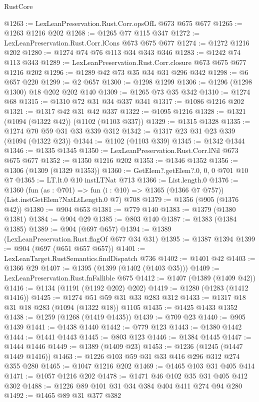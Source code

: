 \begin{lexlean}{RustCore}
\begin{coremodule}
@1263 := LexLeanPreservation.Rust.Corr.opsOfL @673 @675 @677
@1265 := @1263 @1216 @202
@1268 := @1265 @77 @115 @347
@1272 := LexLeanPreservation.Rust.Corr.lCons @673 @675 @677
@1274 := @1272 @1216 @202
@1280 := @1274 @74 @76 @113 @34 @343 @346
@1283 := @1242 @74 @113 @343
@1289 := LexLeanPreservation.Rust.Corr.closure @673 @675 @677 @1216 @202
@1296 := @1289 @42 @73 @35 @34 @31 @296 @342
@1298 := @6 @657 @220
@1299 := @2 @657
@1300 := @1298 @1299
@1306 := @1296 (@1298 @1300) @18 @202 @202 @140
@1309 := @1265 @73 @35 @342
@1310 := @1274 @68
@1315 := @1310 @72 @31 @34 @337 @341
@1317 := @1086 @1216 @202
@1321 := @1317 @42 @31 @42 @337
@1322 := @1095 @1216
@1328 := @1321 (@1094 (@1322 @42)) (@1102 (@1103 @337))
@1329 := @1315 @1328
@1335 := @1274 @70 @59 @31 @33 @339 @312
@1342 := @1317 @23 @31 @23 @339 (@1094 (@1322 @23))
@1344 := @1102 (@1103 @339)
@1345 := @1342 @1344
@1346 := @1335 @1345
@1350 := LexLeanPreservation.Rust.Corr.lNil @673 @675 @677
@1352 := @1350 @1216 @202
@1353 := @1346 @1352
@1356 := @1306 (@1309 (@1329 @1353))
@1360 := GetElem?.getElem?.{0, 0, 0} @701 @10 @7
@1365 := LT.lt.{0} @10 instLTNat @713
@1366 := List.length.{0}
@1376 := @1360
    (fun (as : @701) => fun (i : @10) => @1365 (@1366 @7 @757))
    (List.instGetElem?NatLtLength.{0} @7)
    @708
@1379 := @1356 (@905 (@1376 @42))
@1380 := @904 @653
@1381 := @779 @140
@1383 := @1379 (@1380 @1381)
@1384 := @904 @29
@1385 := @803 @140
@1387 := @1383 (@1384 @1385)
@1389 := @904 (@697 @657)
@1394 := @1389 (LexLeanPreservation.Rust.flagOf @677 @34 @31)
@1395 := @1387 @1394
@1399 := @904 (@697 (@651 @657 @657))
@1401 := LexLeanTarget.RustSemantics.findDispatch @736
@1402 := @1401 @42
@1403 := @1366 @29
@1407 := @1395 (@1399 (@1402 (@1403 @35)))
@1409 := LexLeanPreservation.Rust.fnFallible @675
@1412 := @1407 (@1389 (@1409 @42))
@1416 := @1134 (@1191 (@1192 @202) @202)
@1419 := @1280 (@1283 (@1412 @1416))
@1425 := @1274 @51 @59 @31 @33 @283 @312
@1433 := @1317 @18 @31 @18 @283 (@1094 (@1322 @18)) @1105
@1435 := @1425 @1433 @1352
@1438 := @1259 (@1268 (@1419 @1435))
@1439 := @709 @23
@1440 := @905 @1439
@1441 := @1438 @1440
@1442 := @779 @123
@1443 := @1380 @1442
@1444 := @1441 @1443
@1445 := @803 @123
@1446 := @1384 @1445
@1447 := @1444 @1446
@1449 := @1389 (@1409 @23)
@1453 := @1236 (@1245 (@1447 @1449 @1416))
@1463 := @1226 @103 @59 @31 @33 @416 @296 @312 @274 @355 @280
@1465 := @1047 @1216 @202
@1469 := @1465 @103 @31 @405 @414
@1471 := @1057 @1216 @202
@1478 := @1471 @46 @102 @35 @31 @405 @412 @302
@1488 := @1226 @89 @101 @31 @34 @384 @404 @411 @274 @94 @280
@1492 := @1465 @89 @31 @377 @382

\end{coremodule}
\end{lexlean}
